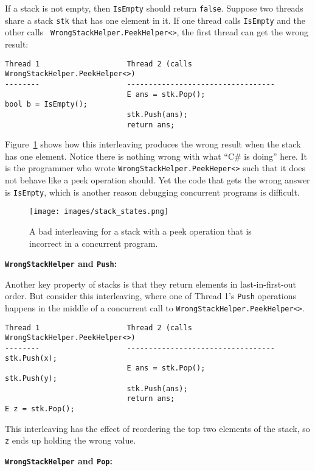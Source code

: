 \documentclass[10pt]{article}
\begin{document}
If a stack is not empty, then {\tt IsEmpty} should return {\tt false}.
Suppose two threads share a stack {\tt stk} that has one element in
it.  If one thread calls {\tt IsEmpty} and the other calls {\tt
  WrongStackHelper.PeekHelper<>}, the first thread can get the wrong result:
\begin{verbatim}
Thread 1                    Thread 2 (calls WrongStackHelper.PeekHelper<>)
--------                    ----------------------------------
                            E ans = stk.Pop();
bool b = IsEmpty();
                            stk.Push(ans);
                            return ans;
\end{verbatim}
Figure~\ref{fig:stack_states} shows how this interleaving produces the
wrong result when the stack has one element.  Notice there is nothing wrong with what ``C\# is doing'' here.  It is
the programmer who wrote {\tt WrongStackHelper.PeekHeper<>} such that it
does not behave like a peek operation should.  Yet the code that gets the
wrong answer is {\tt IsEmpty}, which is another reason debugging
concurrent programs is difficult.

\begin{figure}
\begin{center}
\texttt{[image: images/stack\_states.png]}
\end{center}
\caption{A bad interleaving for a stack with a peek operation that is
  incorrect in a concurrent program.}
\label{fig:stack_states}
\end{figure}


\medskip
\noindent\textbf{{\tt WrongStackHelper} and {\tt Push}:}
\medskip

Another key property of stacks is that they return elements in
last-in-first-out order.  But consider this interleaving, where one of
Thread 1's {\tt Push} operations happens in the middle of a concurrent
call to {\tt WrongStackHelper.PeekHelper<>}.
\begin{verbatim}
Thread 1                    Thread 2 (calls WrongStackHelper.PeekHelper<>)
--------                    ----------------------------------
stk.Push(x);
                            E ans = stk.Pop();
stk.Push(y);
                            stk.Push(ans);
                            return ans;
E z = stk.Pop();
\end{verbatim}
This interleaving has the effect of reordering the top two elements of
the stack, so {\tt z} ends up holding the wrong value.

\medskip
\noindent\textbf{{\tt WrongStackHelper} and {\tt Pop}:}
\medskip
\end{document}

